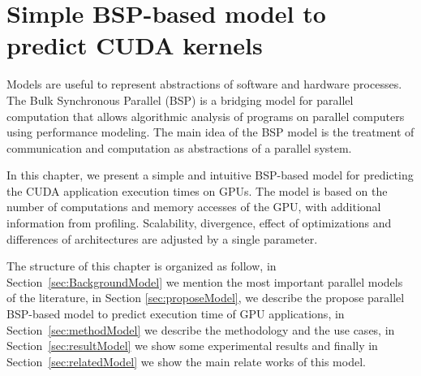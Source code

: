 \chapter{Simple BSP-based model to predict CUDA kernels}\label{chap:BSPmodel}
Models are useful to represent abstractions of software and hardware processes. The Bulk Synchronous Parallel (BSP) is a bridging model for parallel computation that allows algorithmic analysis of programs on parallel computers using performance modeling. The main idea of the BSP model is the treatment of communication and computation as abstractions of a parallel system.

In this chapter, we present a simple and intuitive BSP-based model for predicting the CUDA application execution times on GPUs. The model is based on the number of computations and memory accesses of the GPU, with additional information from profiling. Scalability, divergence, effect of optimizations and differences of architectures are adjusted by a single parameter.

The structure of this chapter is organized as follow,  in Section~\ref{sec:BackgroundModel} we mention the most important parallel models of the literature, in Section \ref{sec:proposeModel}, we describe the propose parallel BSP-based model to predict execution time of GPU applications, in Section~\ref{sec:methodModel} we describe the methodology and the use cases, in Section~\ref{sec:resultModel} we show some experimental results and  finally in Section~\ref{sec:relatedModel} we show the main relate works of this model.












